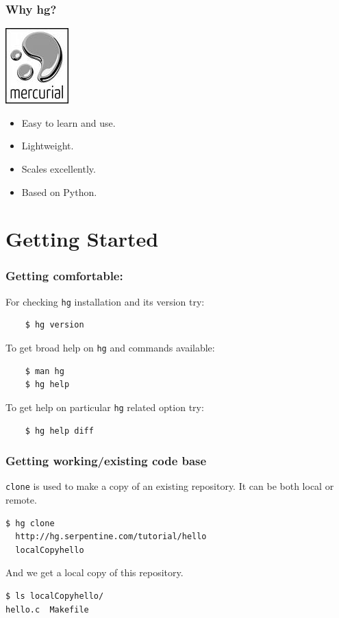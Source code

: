 \documentclass[14pt,compress]{beamer}
\newcounter{time}
\newcommand{\inctime}[1]{\addtocounter{time}{#1}{\tiny \thetime\ m}}
\newcommand{\typ}[1]{\lstinline{#1}}
\begin{document}
\begin{frame}
  \frametitle{Why hg?}
    \includegraphics[height=.75in, interpolate=true]{mercurial}
  \begin{itemize}
  \item Easy to learn and use.
  \item Lightweight.
  \item Scales excellently.
  \item Based on Python.
  \end{itemize}
  \inctime{10}
\end{frame}

\section{Getting Started}

\begin{frame}[fragile]
  \frametitle{Getting comfortable:}
  For checking \typ{hg} installation and its version try:
  \begin{lstlisting}
    $ hg version    
  \end{lstlisting}
  To get broad help on \typ{hg} and commands available:
  \begin{lstlisting}
    $ man hg
    $ hg help
  \end{lstlisting}
  To get help on particular \typ{hg} related option try:
  \begin{lstlisting}
    $ hg help diff
  \end{lstlisting} %
\end{frame}

\begin{frame}[fragile]
  \frametitle{Getting working/existing code base}
  \typ{clone} is used to make a copy of an existing repository. It can be both local or remote.
  \begin{lstlisting}
$ hg clone 
  http://hg.serpentine.com/tutorial/hello 
  localCopyhello
  \end{lstlisting}
  And we get a local copy of this repository. 
  \begin{lstlisting}
$ ls localCopyhello/
hello.c  Makefile
  \end{lstlisting}
\end{frame}
\end{document}
